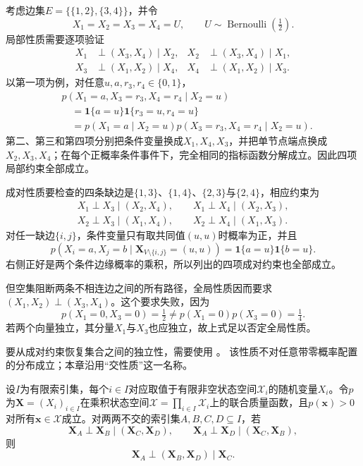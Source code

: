 \begin{example}[局部、成对均不蕴含全局]
  \label{ex:pgm-undirected-local-not-global}
  考虑边集$E=\{\{1,2\},\{3,4\}\}$，并令
  \[
    X_1=X_2=X_3=X_4=U,
    \qquad U\sim\operatorname{Bernoulli}(\tfrac12).
  \]
  局部性质需要逐项验证
  \[
  \begin{aligned}
    X_1&\perp(X_3,X_4)\mid X_2,&
    X_2&\perp(X_3,X_4)\mid X_1,\\
    X_3&\perp(X_1,X_2)\mid X_4,&
    X_4&\perp(X_1,X_2)\mid X_3.
  \end{aligned}
  \]
  以第一项为例，对任意$u,a,r_3,r_4\in\{0,1\}$，
  \[
  \begin{aligned}
    &p(X_1=a,X_3=r_3,X_4=r_4\mid X_2=u)\\
    &\quad=\mathbf{1}\{a=u\}
            \mathbf{1}\{r_3=u,r_4=u\}\\
    &\quad=p(X_1=a\mid X_2=u)
            p(X_3=r_3,X_4=r_4\mid X_2=u).
  \end{aligned}
  \]
  第二、第三和第四项分别把条件变量换成$X_1,X_4,X_3$，并把单节点端点换成$X_2,X_3,X_4$；在每个正概率条件事件下，完全相同的指标函数分解成立。因此四项局部约束全部成立。

  成对性质要检查的四条缺边是$\{1,3\}$、$\{1,4\}$、$\{2,3\}$与$\{2,4\}$，相应约束为
  \[
  \begin{gathered}
    X_1\perp X_3\mid(X_2,X_4),\qquad
    X_1\perp X_4\mid(X_2,X_3),\\
    X_2\perp X_3\mid(X_1,X_4),\qquad
    X_2\perp X_4\mid(X_1,X_3).
  \end{gathered}
  \]
  对任一缺边$\{i,j\}$，条件变量只有取共同值$(u,u)$时概率为正，并且
  \[
    p(X_i=a,X_j=b\mid\bm{X}_{V\setminus\{i,j\}}=(u,u))
    =\mathbf{1}\{a=u\}\mathbf{1}\{b=u\}.
  \]
  右侧正好是两个条件边缘概率的乘积，所以列出的四项成对约束也全部成立。

  但空集阻断两条不相连边之间的所有路径，全局性质因而要求$(X_1,X_2)\perp(X_3,X_4)$。这个要求失败，因为
  \[
    p(X_1=0,X_3=0)=\tfrac12
    \neq p(X_1=0)p(X_3=0)=\tfrac14.
  \]
  若两个向量独立，其分量$X_1$与$X_3$也应独立，故上式足以否定全局性质。
\end{example}

要从成对约束恢复集合之间的独立性，需要使用
。
该性质不对任意带零概率配置的分布成立；本章沿用“交性质”这一名称。

\begin{lemma}[严格正分布的交性质]
  \label{lem:pgm-undirected-intersection}
  设$I$为有限索引集，每个$i\in I$对应取值于有限非空状态空间$\mathcal{X}_i$的随机变量$X_i$。令$p$为$\bm{X}=(X_i)_{i\in I}$在乘积状态空间$\mathcal{X}=\prod_{i\in I}\mathcal{X}_i$上的联合质量函数，且$p(\bm{x})>0$对所有$\bm{x}\in\mathcal{X}$成立。对两两不交的索引集$A,B,C,D\subseteq I$，若
  \[
    \bm{X}_A\perp\bm{X}_B\mid(\bm{X}_C,\bm{X}_D),
    \qquad
    \bm{X}_A\perp\bm{X}_D\mid(\bm{X}_C,\bm{X}_B),
  \]
  则
  \[
    \bm{X}_A\perp(\bm{X}_B,\bm{X}_D)\mid\bm{X}_C.
  \]
\end{lemma}

